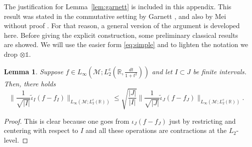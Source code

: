\documentclass[psamsfonts]{amsart}
\newtheorem{lemma}[theorem]{Lemma}
\newcommand{\Linfty}{L_\infty}
\newcommand{\Ltwoc}{L_2^c}
\begin{document}
    The justification for Lemma~\ref{lem:garnett} is included in this
    appendix. This result was stated in the commutative setting by
    Garnett \cite{G07}, and also by Mei without proof \cite{M07}. For
    that reason, a general version of the argument is developed
    here. Before giving the explicit construction, some preliminary
    classical results are showed. We will use the easier form
    \eqref{eq:simple} and to lighten the notation we drop $\otimes \mathds 1$.
\begin{lemma}\label{lem:auxiliarGarnett1}
  Suppose $f \in \Linfty(\mathcal{M};\Ltwoc(\mathbb{R},\frac{dt}{1+t^2}))$ and let $I\subset J$ be finite intervals. Then, there holds
  $$\big\| \frac1{\sqrt {|I|}} \widetilde{\iota}_I(f -f_I) \big\|_{\Linfty(\mathcal{M};\Ltwoc(\mathbb{R}))} \leq\sqrt{ \frac {|J|}{|I|}}  \big\| \frac1{\sqrt {|J|}} \widetilde{\iota}_J(f - f_J) \big\|_{\Linfty(\mathcal{M};\Ltwoc(\mathbb{R}))}.$$
   \end{lemma}
    \begin{proof} This is clear because one goes from $\iota_J(f - f_J)$
just by restricting and centering with respect to $I$ and all these operations are contractions at the $L_2$-level.
            \end{proof}
\end{document}
